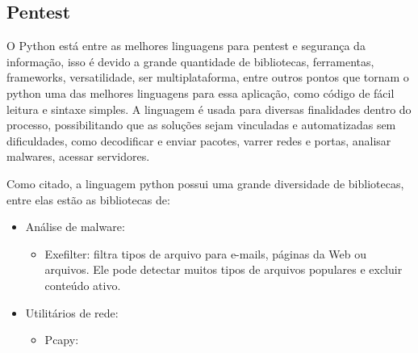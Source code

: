         \subsection{Pentest} 
        O Python está entre as melhores linguagens para pentest e segurança da informação, isso é devido a grande quantidade de bibliotecas, ferramentas, frameworks, versatilidade, ser multiplataforma, entre outros pontos que tornam o python uma das melhores linguagens para essa aplicação, como código de fácil leitura e sintaxe simples. A linguagem é usada para diversas finalidades dentro do processo, possibilitando que as soluções sejam vinculadas e automatizadas sem dificuldades, como decodificar e enviar pacotes, varrer redes e portas, analisar malwares, acessar servidores.
        
        Como citado, a linguagem python possui uma grande diversidade de bibliotecas, entre elas estão as bibliotecas de:
        \begin{itemize}
        \item Análise de malware:
        	\begin{itemize}
        		\item Exefilter:  filtra tipos de arquivo para e-mails, páginas da Web ou arquivos. Ele pode detectar muitos tipos de arquivos populares e excluir conteúdo ativo.
        	\end{itemize}
        \item Utilitários de rede:
        	\begin{itemize}
        		\item Pcapy:
        	\end{itemize}
        \end{itemize}
    
   
    	